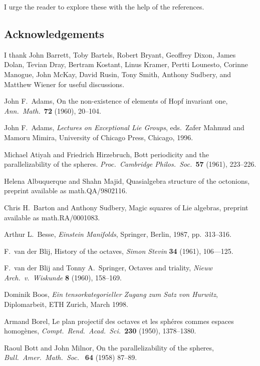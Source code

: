 \documentclass[12pt]{article}
\begin{document}
\noindent I urge the reader to explore these with the help of the references.

\subsection*{Acknowledgements}  

I thank John Barrett, Toby Bartels, Robert Bryant, Geoffrey Dixon, James 
Dolan, Tevian Dray, Bertram Kostant, Linus Kramer, Pertti Lounesto,
Corinne Manogue, John McKay, David Rusin, Tony Smith, Anthony Sudbery, and 
Matthew Wiener for useful discussions.    
   
\begin{thebibliography}{10}   

 John F.\ Adams,
On the non-existence of elements of Hopf invariant
one, {\sl Ann.\ Math.\ }{\bf 72} (1960), 20--104.

 John F.\ Adams, {\sl Lectures on Exceptional Lie   
Groups}, eds.\ Zafer Mahmud and Mamoru Mimira, University of    
Chicago Press, Chicago, 1996.   

 Michael Atiyah and Friedrich Hirzebruch, 
Bott periodicity and the parallelizability of the spheres. 
{\sl Proc.\ Cambridge Philos.\ Soc.\ }{\bf 57} (1961), 223--226. 

 Helena Albuquerque and Shahn Majid, Quasialgebra structure  
of the octonions, preprint available as math.QA/9802116.   
 
 Chris H.\ Barton and Anthony Sudbery, Magic squares of Lie    
algebras, preprint available as math.RA/0001083.   
  
 Arthur L.\ Besse, {\sl Einstein Manifolds}, Springer,   
Berlin, 1987, pp.\ 313--316.   
 
 F.\ van der Blij, History of the octaves, {\sl Simon 
Stevin} {\bf 34} (1961), 106---125. 
 
 F.\ van der Blij and Tonny A.\ Springer, Octaves and 
triality, {\sl Nieuw Arch.\ v.\ Wiskunde} {\bf 8} (1960), 158--169. 

 Dominik Boos, {\sl Ein tensorkategorieller Zugang zum Satz 
von Hurwitz}, Diplomarbeit, ETH Zurich, March 1998.

 Armand Borel, Le plan projectif des octaves et les sph\'eres
commes espaces homog\`enes, {\sl Compt.\ Rend.\ Acad.\ Sci.\ }{\bf 230}
(1950), 1378--1380.

 Raoul Bott and John Milnor, On the parallelizability   
of the spheres, {\sl Bull.\ Amer.\ Math.\ Soc.\ } {\bf 64} (1958)   
87--89.   
 

\end{thebibliography}
\end{document}
